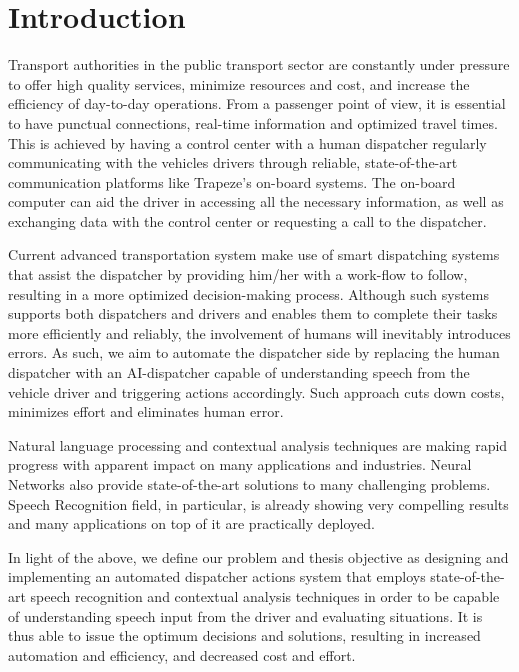 \chapter{Introduction}
\label{chap:intro}

Transport authorities in the public transport sector are constantly under pressure to offer high quality services, minimize resources and cost, and increase the efficiency of day-to-day operations. From a passenger point of view, it is essential to have punctual connections, real-time information and optimized travel times. This is achieved by having a control center with a human dispatcher regularly communicating with the vehicles drivers through reliable, state-of-the-art communication platforms like Trapeze's on-board systems. The on-board computer can aid the driver in accessing all the necessary information, as well as exchanging data with the control center or requesting a call to the dispatcher. 

Current advanced transportation system make use of smart dispatching systems that assist the dispatcher by providing him/her with a work-flow to follow, resulting in a more optimized decision-making process. Although such systems supports both dispatchers and drivers and enables them to complete their tasks more efficiently and reliably, the involvement of humans will inevitably introduces errors. As such, we aim to automate the dispatcher side by replacing the human dispatcher with an \ac{AI}-dispatcher capable of understanding speech from the vehicle driver and triggering actions accordingly. Such approach cuts down costs, minimizes effort and eliminates human error. 


Natural language processing and contextual analysis techniques are making rapid progress with apparent impact on many applications and industries. Neural Networks also provide state-of-the-art solutions to many challenging problems. Speech Recognition field, in particular, is already showing very compelling results and many applications on top of it are practically deployed.


In light of the above, we define our problem and thesis objective as designing and implementing an automated dispatcher actions system that employs state-of-the-art speech recognition and contextual analysis techniques in order to be capable of understanding speech input from the driver and evaluating situations. It is thus able to issue the optimum decisions and solutions, resulting in increased automation and efficiency, and decreased cost and effort.

